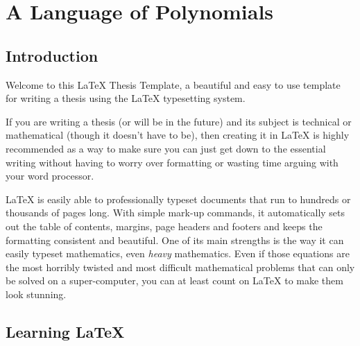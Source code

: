 
\chapter{A Language of Polynomials} %

\label{Chapter1} %


\newcommand{\keyword}[1]{\textbf{#1}}
\newcommand{\tabhead}[1]{\textbf{#1}}
\newcommand{\code}[1]{\texttt{#1}}
\newcommand{\file}[1]{\texttt{\bfseries#1}}
\newcommand{\option}[1]{\texttt{\itshape#1}}


\section{Introduction}
Welcome to this \LaTeX{} Thesis Template, a beautiful and easy to use template for writing a thesis using the \LaTeX{} typesetting system.

If you are writing a thesis (or will be in the future) and its subject is technical or mathematical (though it doesn't have to be), then creating it in \LaTeX{} is highly recommended as a way to make sure you can just get down to the essential writing without having to worry over formatting or wasting time arguing with your word processor.

\LaTeX{} is easily able to professionally typeset documents that run to hundreds or thousands of pages long. With simple mark-up commands, it automatically sets out the table of contents, margins, page headers and footers and keeps the formatting consistent and beautiful. One of its main strengths is the way it can easily typeset mathematics, even \emph{heavy} mathematics. Even if those equations are the most horribly twisted and most difficult mathematical problems that can only be solved on a super-computer, you can at least count on \LaTeX{} to make them look stunning.


\section{Learning \LaTeX{}}


